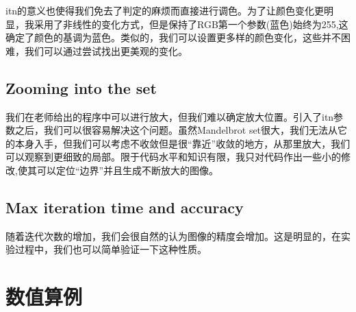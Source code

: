 \documentclass{ctexart}
\begin{document}
itn的意义也使得我们免去了判定的麻烦而直接进行调色。为了让颜色变化更明显，我采用了非线性的变化方式，但是保持了RGB第一个参数(蓝色)始终为255,这确定了颜色的基调为蓝色。类似的，我们可以设置更多样的颜色变化，这些并不困难，我们可以通过尝试找出更美观的变化。
\subsection{Zooming into the set}
我们在老师给出的程序中可以进行放大，但我们难以确定放大位置。引入了itn参数之后，我们可以很容易解决这个问题。虽然Mandelbrot set很大，我们无法从它的本身入手，但我们可以考虑不收敛但是很“靠近”收敛的地方，从那里放大，我们可以观察到更细致的局部。限于代码水平和知识有限，我只对代码作出一些小的修改,使其可以定位“边界”并且生成不断放大的图像。
\subsection{Max iteration time and accuracy}
随着迭代次数的增加，我们会很自然的认为图像的精度会增加。这是明显的，在实验过程中，我们也可以简单验证一下这种性质。
\section{数值算例}
\end{document}
